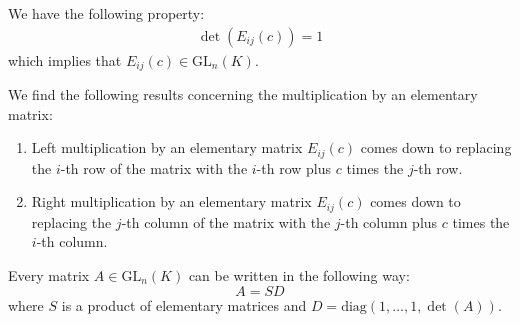         \begin{property}
        	We have the following property:
		\begin{gather}
			\det(E_{ij}(c)) = 1
		\end{gather}
		which implies that $E_{ij}(c)\in\text{GL}_n(K)$.
	\end{property}
        \begin{property}
		We find the following results concerning the multiplication by an elementary matrix:
	        \begin{enumerate}
			\item Left multiplication by an elementary matrix $E_{ij}(c)$ comes down to replacing the $i$-th row of the matrix with the $i$-th row plus $c$ times the $j$-th row.
                	\item Right multiplication by an elementary matrix $E_{ij}(c)$ comes down to replacing the $j$-th column of the matrix with the $j$-th column plus $c$ times the $i$-th column.
		\end{enumerate}
		\end{property}
        
        \begin{theorem}\label{linalgebra:theorem:elementary_matrices}
		Every matrix $A\in\text{GL}_n(K)$ can be written in the following way: \[A = SD\] where $S$ is a product of elementary matrices and $D=\text{diag}(1,\dotso,1,\det(A))$.
	\end{theorem}
        
